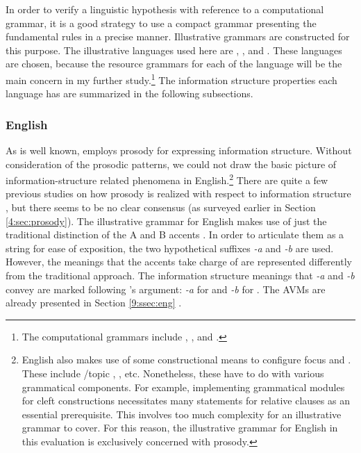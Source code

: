 In order to verify a linguistic hypothesis with reference to a
computational grammar, it is a good strategy
to use a compact grammar presenting the fundamental rules in a precise
manner. Illustrative grammars are constructed for this purpose.  The
illustrative languages used here are , ,
and .  These languages are chosen, because the resource
grammars for each of the language will be the main concern in my
further study.\footnote{The computational grammars include 
  \citealp{flickinger:00},  \citep{siegel:etal:16}, and
   \citep{kim:etal:11}.}  The information structure
properties each language has are summarized in the following
subsections.



\subsubsection{English}
\label{13:sssec:eng}


As is well known,  employs prosody for
expressing information structure.  Without consideration of the
prosodic patterns, we could not draw the basic picture of
information-structure related phenomena in English.\footnote{English
  also makes use of some constructional means to configure focus and
  . These include /topic ,
  , etc. Nonetheless, these have to do with various
  grammatical components. For example, implementing grammatical
  modules for cleft constructions necessitates many 
  statements for relative clauses as an essential
  prerequisite. This involves too much complexity
  for an illustrative grammar to cover.  For this reason, the
  illustrative grammar for English in this evaluation is exclusively
  concerned with prosody.} There are quite a few previous studies on
how prosody is realized with respect to information structure
\citep{jackendoff:72,steedman:00,kadmon:01,buring:03,hedberg:06}, but
there seems to be no clear consensus (as surveyed earlier in Section
\ref{4:sec:prosody}). The illustrative
grammar for English makes use of just the traditional distinction of
the A and B accents \citep{bolinger:58}. In order to articulate them
as a string for ease of exposition, the two hypothetical suffixes
\textit{-a} and \textit{-b} are used. However, the meanings that the
accents take charge of are represented differently from the
traditional approach. The information structure meanings that
\textit{-a} and \textit{-b} convey are marked following
\citeauthor{hedberg:06}'s argument: \textit{-a} for
 and \textit{-b} for
. The AVMs are already
presented in Section \ref{9:ssec:eng} .




